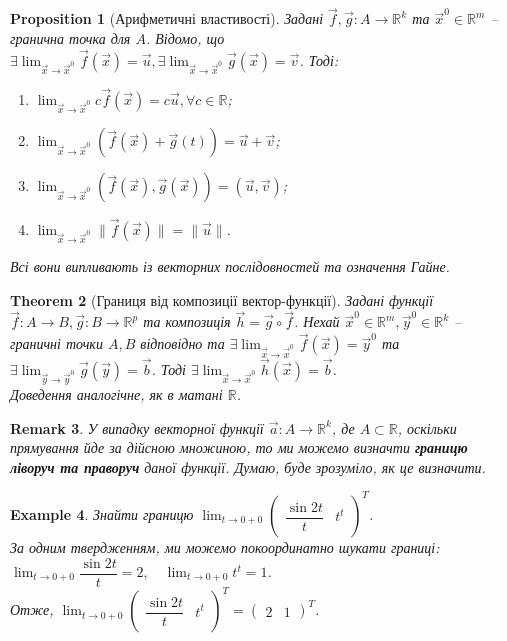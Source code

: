 \documentclass[a4paper, 10pt]{article}
\def\huge{\displaystyle}
\theoremstyle{theoremdd}
\newtheorem{theorem}{Theorem}[subsection]
\theoremstyle{theoremdd}
\theoremstyle{theoremdd}
\theoremstyle{theoremdd}
\theoremstyle{theoremdd}
\newtheorem{example}[theorem]{Example}
\theoremstyle{theoremdd}
\newtheorem{proposition}[theorem]{Proposition}
\theoremstyle{theoremdd}
\newtheorem{remark}[theorem]{Remark}
\theoremstyle{theoremdd}
\theoremstyle{theoremdd}
\begin{document}
\begin{proposition}[Арифметичні властивості]
Задані $\vec{f},\vec{g} \colon A \to \mathbb{R}^k$ та $\vec{x}^0 \in \mathbb{R}^m$ -- гранична точка для $A$. Відомо, що $\exists \huge \lim_{\vec{x} \to \vec{x}^0} \vec{f}(\vec{x}) = \vec{u}, \exists \lim_{\vec{x} \to \vec{x}^0} \vec{g}(\vec{x}) = \vec{v}$. Тоді:
\begin{enumerate}[nosep,wide=0pt,label={\arabic*)}]
\item $\huge \lim_{\vec{x} \to \vec{x}^0} c \vec{f}(\vec{x}) = c \vec{u}, \forall c \in \mathbb{R}$;
\item $\huge \lim_{\vec{x} \to \vec{x}^0} (\vec{f}(\vec{x}) + \vec{g}(t)) = \vec{u} + \vec{v}$;
\item $\huge \lim_{\vec{x} \to \vec{x}^0} (\vec{f}(\vec{x}),\vec{g}(\vec{x})) = (\vec{u},\vec{v})$;
\item $\displaystyle \lim_{\vec{x} \to \vec{x}^0} \| \vec{f}(\vec{x}) \| = \| \vec{u} \|$.
\end{enumerate}
\textit{Всі вони випливають із векторних послідовностей та означення Гайне.}
\end{proposition}

\begin{theorem}[Границя від композиції вектор-функції]
Задані функції $\vec{f} \colon A \to B, \vec{g} \colon B \to \mathbb{R}^p$ та композиція $\vec{h} = \vec{g} \circ \vec{f}$. Нехай $\vec{x}^0 \in \mathbb{R}^m,\vec{y}^0 \in \mathbb{R}^k$ -- граничні точки $A,B$ відповідно та $\exists \displaystyle\lim_{\vec{x} \to \vec{x}^0} \vec{f}(\vec{x}) = \vec{y}^0$ та $\exists \displaystyle\lim_{\vec{y} \to \vec{y}^0} \vec{g}(\vec{y}) = \vec{b}$. Тоді $\exists \displaystyle\lim_{\vec{x} \to \vec{x}^0} \vec{h}(\vec{x}) = \vec{b}$.\\
\textit{Доведення аналогічне, як в матані $\mathbb{R}$.}
\end{theorem}

\begin{remark}
У випадку векторної функції $\vec{a} \colon A \to \mathbb{R}^k$, де $A \subset \mathbb{R}$, оскільки прямування йде за дійсною множиною, то ми можемо визначти \textbf{границю ліворуч та праворуч} даної функції. Думаю, буде зрозуміло, як це визначити.
\end{remark}

\begin{example}
Знайти границю $\huge\lim_{t \to 0+0} \begin{pmatrix}
\dfrac{\sin 2t}{t} & t^t
\end{pmatrix}^T$.\\
За одним твердженням, ми можемо покоординатно шукати границі: $\huge\lim_{t \to 0+0} \dfrac{\sin 2t}{t} = 2, \quad \huge\lim_{t \to 0+0} t^t = 1$.\\
Отже, $\huge\lim_{t \to 0+0} \begin{pmatrix}
\dfrac{\sin 2t}{t} & t^t
\end{pmatrix}^T = \begin{pmatrix}
2 & 1
\end{pmatrix}^T$.
\end{example}
\end{document}
